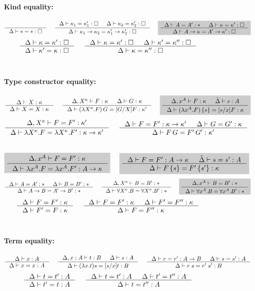 \begin{figure}
\begin{framed}
\paragraph{Kind equality:}
\[ \inference{}{\Delta |- * = *:\square}
 ~~~~
   \inference{ \Delta |- \kappa_1 = \kappa_1' : \square
             & \Delta |- \kappa_2 = \kappa_2' : \square }
             {\Delta |- \kappa_1 -> \kappa_2 = \kappa_1' -> \kappa_2' : \square}
 ~~~~ \newFi{
   \inference{\Delta |- A=A':* & \Delta |- \kappa=\kappa':\square}
             {\Delta |- A -> \kappa = A' -> \kappa' : \square} }
\]
\[ \inference{\Delta |- \kappa=\kappa':\square}
             {\Delta |- \kappa'=\kappa:\square}
 ~~~~
   \inference{ \Delta |- \kappa =\kappa' :\square
             & \Delta |- \kappa'=\kappa'':\square}
             {\Delta |- \kappa=\kappa'':\square}
\]
~\\
\paragraph{Type constructor equality:}
\[ \inference{\Delta |- X:\kappa }{\Delta |- X=X:\kappa}
 ~~~~
   \inference{\Delta,X^\kappa |- F:\kappa & \Delta |- G:\kappa}
             {\Delta |- (\lambda X^\kappa.F)\,G = [G/X]F:\kappa'}
 ~~~~ \newFi{
   \inference{\Delta,x^A |- F:\kappa & \hat\Delta |- s:A}
             {\Delta |- (\lambda x^A.F)\,\{s\} = [s/x]F:\kappa} }
\]
\[ \inference{\Delta,X^\kappa |- F=F' : \kappa'}
             {\Delta |- \lambda X^\kappa.F=\lambda X^\kappa.F':\kappa-> \kappa'}
 ~~~~
   \inference{\Delta |- F=F':\kappa->\kappa' & \Delta |- G=G':\kappa}
             {\Delta |- F\,G = F'\,G' : \kappa'}
\]
 ~~~~
\[ \newFi{
   \inference{\Delta,x^A |- F=F' : \kappa}
             {\Delta |- \lambda x^A.F=\lambda x^A.F' : A -> \kappa} }
 ~~~~ \newFi{
   \inference{\Delta |- F=F':A->\kappa & \hat\Delta |- s=s':A}
             {\Delta |- F\,\{s\} = F'\,\{s'\} : \kappa} }
\]
\[ \inference{\Delta |- A=A':* & \Delta |- B=B':*}{\Delta |- A-> B=A'-> B':*}
 ~~~~
   \inference{\Delta,X^\kappa |- B=B':*}
             {\Delta |- \forall X^\kappa.B=\forall X^\kappa.B':*}
 ~~~~ \newFi{
   \inference{\Delta,x^A |- B=B':*}
             {\Delta |- \forall x^A.B=\forall x^A.B':*} }
\]
\[ \inference{\Delta |- F = F' : \kappa}{\Delta |- F' = F : \kappa}
 ~~~~
   \inference{\Delta |- F = F' : \kappa & \Delta |- F' = F'' : \kappa}
             {\Delta |- F = F'' : \kappa}
\]
~\\
\paragraph{Term equality:}
\[ \inference{\Delta |- x:A}{\Delta |- x=x:A}
 ~~~~
   \inference{\Delta,x:A |- t:B & \Delta |- s:A}
             {\Delta |- (\lambda x.t)s=[s/x]t : B}
 ~~~~
   \inference{\Delta |- r=r':A-> B & \Delta |- s=s':A}{\Delta |- r\;s=r'\;s':B}
\]
\[ \inference{\Delta |- t=t':A}{\Delta |- t'=t:A}
 ~~~~
   \inference{\Delta |- t=t':A & \Delta |- t'=t'':A}{\Delta |- t=t'':A}
\]
~\\

\end{framed}
\end{figure}
